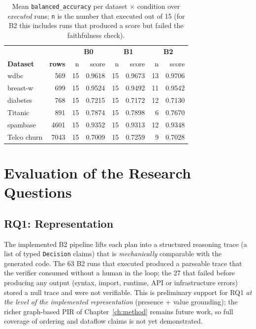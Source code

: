 \begin{table}[H]
\centering
\caption{Mean \texttt{balanced\_accuracy} per dataset $\times$
condition over \emph{executed} runs; \texttt{n} is the number that
executed out of 15 (for B2 this includes runs that produced a score
but failed the faithfulness check).}
\label{tab:perdataset}
\scriptsize
\renewcommand{\arraystretch}{1.25}
\begin{tabular}{l r | r r | r r | r r}
\toprule
& & \multicolumn{2}{c|}{\textbf{B0}} & \multicolumn{2}{c|}{\textbf{B1}}
& \multicolumn{2}{c}{\textbf{B2}} \\
\textbf{Dataset} & \textbf{rows} & n & score & n & score & n & score \\
\midrule
wdbc        & 569  & 15 & 0.9618 & 15 & 0.9673 & 13 & 0.9706 \\
breast-w    & 699  & 15 & 0.9524 & 15 & 0.9492 & 11 & 0.9542 \\
diabetes    & 768  & 15 & 0.7215 & 15 & 0.7172 & 12 & 0.7130 \\
Titanic     & 891  & 15 & 0.7874 & 15 & 0.7898 & 6  & 0.7670 \\
spambase    & 4601 & 15 & 0.9352 & 15 & 0.9313 & 12 & 0.9348 \\
Telco churn & 7043 & 15 & 0.7009 & 15 & 0.7259 & 9  & 0.7028 \\
\bottomrule
\end{tabular}
\end{table}

\section{Evaluation of the Research Questions}

\subsection{RQ1: Representation}

The implemented B2 pipeline lifts each plan into a structured
reasoning trace (a list of typed \texttt{Decision} claims) that is
\emph{mechanically} comparable with the generated code. The 63 B2 runs
that executed produced a parseable trace that the verifier consumed
without a human in the loop; the 27 that failed before producing any
output (syntax, import, runtime, API or infrastructure errors) stored a
null trace and were not verifiable. This is preliminary support for RQ1
\emph{at the level of the implemented representation} (presence + value
grounding);
the richer graph-based PIR of Chapter~\ref{ch:method} remains future
work, so full coverage of ordering and dataflow claims is not yet
demonstrated.

